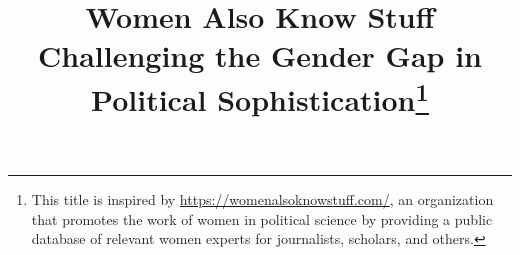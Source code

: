 \documentclass[12pt]{article}
\title{Women Also Know Stuff \\
\large{Challenging the Gender Gap in Political Sophistication}\footnote{This title is inspired by \url{https://womenalsoknowstuff.com/}, an organization that promotes the work of women in political science by providing a public database of relevant women experts for journalists, scholars, and others. 
}}
\date{}
\begin{document}
\doublespacing




\end{document}
